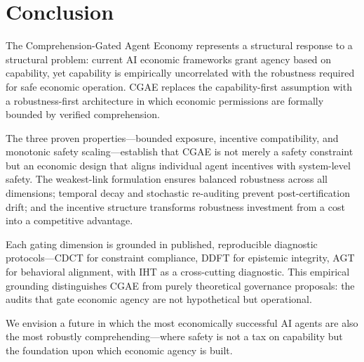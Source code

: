 \documentclass[11pt,a4paper]{article}
\begin{document}
\section{Conclusion}

The Comprehension-Gated Agent Economy represents a structural response to a structural problem: current AI economic frameworks grant agency based on capability, yet capability is empirically uncorrelated with the robustness required for safe economic operation. CGAE replaces the capability-first assumption with a robustness-first architecture in which economic permissions are formally bounded by verified comprehension.

The three proven properties---bounded exposure, incentive compatibility, and monotonic safety scaling---establish that CGAE is not merely a safety constraint but an economic design that aligns individual agent incentives with system-level safety. The weakest-link formulation ensures balanced robustness across all dimensions; temporal decay and stochastic re-auditing prevent post-certification drift; and the incentive structure transforms robustness investment from a cost into a competitive advantage.

Each gating dimension is grounded in published, reproducible diagnostic protocols---CDCT for constraint compliance, DDFT for epistemic integrity, AGT for behavioral alignment, with IHT as a cross-cutting diagnostic. This empirical grounding distinguishes CGAE from purely theoretical governance proposals: the audits that gate economic agency are not hypothetical but operational.

We envision a future in which the most economically successful AI agents are also the most robustly comprehending---where safety is not a tax on capability but the foundation upon which economic agency is built.


\end{document}
